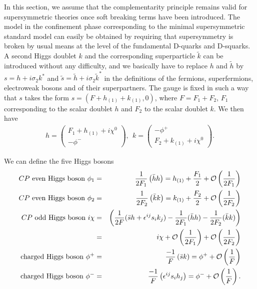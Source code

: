 \documentclass[a4paper,12pt]{article}
\begin{document}
In this section, we assume that the complementarity principle remains
valid for supersymmetric theories once soft breaking terms have been
introduced. The model in the confinement phase corresponding to the
minimal supersymmetric standard model can easily be obtained by
requiring that supersymmetry is broken by usual means at the level of
the fundamental D-quarks and D-squarks. A second Higgs doublet $k$ and
the corresponding superparticle $\tilde k$ can be introduced without
any difficulty, and we basically have to replace $h$ and $\tilde h$ by
$s=h + i \sigma_2 k^*$ and $\tilde s= \tilde h + i \sigma_2 \tilde
k^*$ in the definitions of the fermions, superfermions, electroweak
bosons and of their superpartners. The gauge is fixed in such a way
that $s$ takes the form $s=(F+ h_{(1)} + k_{(1)},0)$, where
$F=F_1+F_2$, $F_1$ corresponding to the scalar doublet $h$ and $F_2$
to the scalar doublet $k$. We then have
\begin{eqnarray}
h= \left(\begin{array}{c}
    F_1 + h_{(1)} + i \chi^0 \\  - \phi^- \end{array}
\right ), \ \
k= \left(\begin{array}{c}
    - \phi^+ \\ F_2 + k_{(1)} + i \chi^0 \end{array}
\right ).
\end{eqnarray}
 
We can define the five Higgs bosons
\begin{eqnarray}
\mbox{$CP$ even Higgs boson} \
\phi_1&=& \frac{1}{2 F_1} \left ({\bar h h}
\right)
  = h_{(1)}+ \frac{F_1}{2} + {\cal O}\left(\frac{1}{ 2 F_1}\right)
\\ \nonumber
\mbox{$CP$ even Higgs boson} \
\phi_2&=& \frac{1}{2 F_2} \left ({\bar k k}
\right)
  = k_{(1)}+ \frac{F_2}{2} + {\cal O}\left(\frac{1}{2 F_2}\right)
\\\
\mbox{$CP$ odd Higgs boson} \
i \chi&=& \left (
\frac{1}{2 F} (\bar s h +  \epsilon^{ij} s_i k_j) 
-\frac{1}{2 F_1} (\bar h h)- \frac{1}{2 F_2} (\bar k k) \right)
\nonumber \\ &=& i \chi + {\cal O}\left(\frac{1}{ 2 F_1}\right)
+ {\cal O}\left(\frac{1}{2 F_2}\right)
\nonumber 
\\
\mbox{charged Higgs boson} \
\phi^+&=& \frac{-1}{F} \left ({\bar s k}
\right)
  = \phi^+ + {\cal O}\left(\frac{1}{ F}\right)
\nonumber
\\
\mbox{charged Higgs boson} \
\phi^-&=& \frac{-1}{F} \left ({\epsilon^{ij} s_i h_j}
\right)
  = \phi^- + {\cal O}\left(\frac{1}{ F}\right).
\nonumber 
\end{eqnarray}
\end{document}
